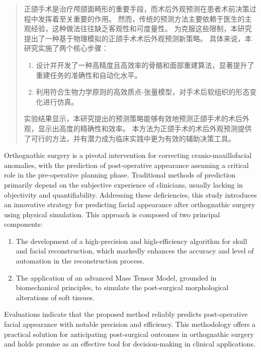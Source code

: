 

\begin{abstract}
  正颌手术是治疗颅颌面畸形的重要手段，而术后外观预测在患者术前决策过程中发挥着至关重要的作用。
  然而，传统的预测方法主要依赖于医生的主观经验，这种做法往往缺乏客观性和可度量性。
  为克服这些限制，本研究提出了一种基于物理模拟的正颌手术术后外观预测新策略。
  具体来说，本研究实施了两个核心步骤：
  \begin{enumerate}
    \item 设计并开发了一种高精度且高效率的骨骼和面部重建算法，显著提升了重建任务的准确性和自动化水平。
    \item 利用符合生物力学原则的高效质点-张量模型，对手术后软组织的形态变化进行仿真。
  \end{enumerate}
  实验结果显示，本研究提出的预测策略能够有效地预测正颌手术的术后外观，显示出高度的精确性和效率。
  本方法为正颌手术的术后外观预测提供了可行的方法，并有潜力成为临床实践中更为有效的辅助决策工具。

\end{abstract}

\begin{abstract*}
  Orthognathic surgery is a pivotal intervention for correcting cranio-maxillofacial anomalies, with the prediction of post-operative appearance assuming a critical role in the pre-operative planning phase.
  Traditional methods of prediction primarily depend on the subjective experience of clinicians, usually lacking in objectivity and quantifiability.
  Addressing these deficiencies, this study introduces an innovative strategy for predicting facial appearance after orthognathic surgery using physical simulation.
  This approach is composed of two principal components:
  \begin{enumerate}
    \item The development of a high-precision and high-efficiency algorithm for skull and facial reconstruction, which markedly enhances the accuracy and level of automation in the reconstruction process.
    \item The application of an advanced Mass Tensor Model, grounded in biomechanical principles, to simulate the post-surgical morphological alterations of soft tissues.
  \end{enumerate}
  Evaluations indicate that the proposed method reliably predicts post-operative facial appearance with notable precision and efficiency.
  This methodology offers a practical solution for anticipating post-surgical outcomes in orthognathic surgery and holds promise as an effective tool for decision-making in clinical applications.

\end{abstract*}
